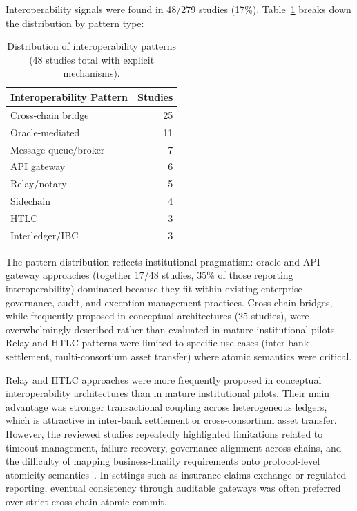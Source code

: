 \documentclass[journal]{IEEEtran}
\begin{document}
Interoperability signals were found in 48/279 studies (17\%). Table~\ref{tab:interop-patterns} breaks down the distribution by pattern type:

\begin{table}[h]
\centering
\small
\begin{tabular}{lr}
\toprule
\textbf{Interoperability Pattern} & \textbf{Studies} \\
\midrule
Cross-chain bridge & 25 \\
Oracle-mediated & 11 \\
Message queue/broker & 7 \\
API gateway & 6 \\
Relay/notary & 5 \\
Sidechain & 4 \\
HTLC & 3 \\
Interledger/IBC & 3 \\
\bottomrule
\end{tabular}
\caption{Distribution of interoperability patterns (48 studies total with explicit mechanisms).}
\label{tab:interop-patterns}
\end{table}

\noindent The pattern distribution reflects institutional pragmatism: oracle and API-gateway approaches (together 17/48 studies, 35\% of those reporting interoperability) dominated because they fit within existing enterprise governance, audit, and exception-management practices. Cross-chain bridges, while frequently proposed in conceptual architectures (25 studies), were overwhelmingly described rather than evaluated in mature institutional pilots. Relay and HTLC patterns were limited to specific use cases (inter-bank settlement, multi-consortium asset transfer) where atomic semantics were critical.

Relay and HTLC approaches were more frequently proposed in conceptual interoperability architectures than in mature institutional pilots. Their main advantage was stronger transactional coupling across heterogeneous ledgers, which is attractive in inter-bank settlement or cross-consortium asset transfer. However, the reviewed studies repeatedly highlighted limitations related to timeout management, failure recovery, governance alignment across chains, and the difficulty of mapping business-finality requirements onto protocol-level atomicity semantics~\cite{herlihy2018atomiccrosschain,patsonakis2019crosschain}. In settings such as insurance claims exchange or regulated reporting, eventual consistency through auditable gateways was often preferred over strict cross-chain atomic commit.
\end{document}
